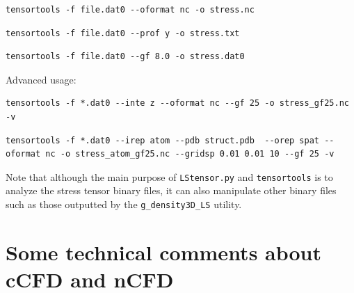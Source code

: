 \documentclass[10pt,letterpaper,notitlepage]{article}
\begin{document}
\begin{lstlisting}[caption={Conversion to NETCDF format}]
tensortools -f file.dat0 --oformat nc -o stress.nc
\end{lstlisting}

\begin{lstlisting}[caption={Compute a stress profile along the y axis and saves it to a text file}]
tensortools -f file.dat0 --prof y -o stress.txt
\end{lstlisting}

\begin{lstlisting}[caption={Smooth data using a gaussian kernel with a standard deviation of 8 (in units of the grid spacing)}]
tensortools -f file.dat0 --gf 8.0 -o stress.dat0
\end{lstlisting}

Advanced usage:

\begin{lstlisting}[caption={Read the IKN stress from *.dat0 files, integrate out the z direction, smooth the data with a Gaussian filter of 25 (units of the grid size), and write the result in the file stress\_gf25.nc}]
tensortools -f *.dat0 --inte z --oformat nc --gf 25 -o stress_gf25.nc -v
\end{lstlisting}

\begin{lstlisting}[caption={Read the stress per atom from *.dat0 files, load the PDB structure from struct.pdb, translate the data to a grid with spacing 0.01, 0.01, 10, apply a Gaussian filter of 25 and store the result in stress\_atom\_gf25.nc}]
tensortools -f *.dat0 --irep atom --pdb struct.pdb  --orep spat --oformat nc -o stress_atom_gf25.nc --gridsp 0.01 0.01 10 --gf 25 -v
\end{lstlisting}

Note that although the main purpose of \texttt{LStensor.py} and \texttt{tensortools} is to analyze the stress tensor binary files, it can also manipulate other binary files such as those outputted by the \texttt{g\_density3D\_LS} utility. 

\section{Some technical comments about cCFD and nCFD}
\end{document}
